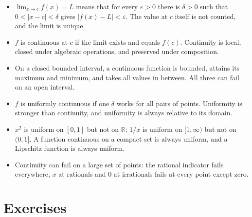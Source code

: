 \begin{ringkasan}
\begin{itemize}
  \item $\lim_{x\to c}f(x)=L$ means that for every $\varepsilon>0$ there is $\delta>0$
        such that $0<|x-c|<\delta$ gives $|f(x)-L|<\varepsilon$. The value at $c$
        itself is not counted, and the limit is unique.
  \item $f$ is continuous at $c$ if the limit exists and equals $f(c)$. Continuity
        is local, closed under algebraic operations, and preserved under
        composition.
  \item On a closed bounded interval, a continuous function is bounded, attains its
        maximum and minimum, and takes all values in between. All three can
        fail on an open interval.
  \item $f$ is uniformly continuous if one $\delta$ works for all pairs of points.
        Uniformity is stronger than continuity, and uniformity is always relative
        to its domain.
  \item $x^{2}$ is uniform on $[0,1]$ but not on $\mathbb{R}$; $1/x$ is uniform
        on $[1,\infty)$ but not on $(0,1]$. A function continuous on a compact
        set is always uniform, and a Lipschitz function is always uniform.
  \item Continuity can fail on a large set of points: the rational indicator fails
        everywhere, $x$ at rationals and $0$ at irrationals fails at every point
        except zero.
\end{itemize}
\end{ringkasan}

\section{Exercises}

